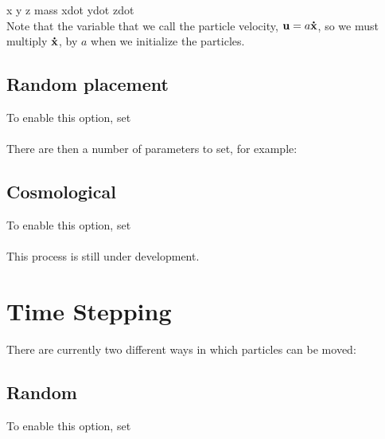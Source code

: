 x y z mass xdot ydot zdot \\

Note that the variable that we call the particle velocity, ${\mathbf u} = a {\bf \dot{x}}$, 
so we must multiply ${\bf \dot{x}}$, by $a$ when we initialize the particles.

\subsection{Random placement}

To enable this option, set \\

 \\

\noindent There are then a number of parameters to set, for example: \\




\subsection{Cosmological}

To enable this option, set \\

 \\

\noindent This process is still under development.

\section{Time Stepping}

\noindent There are currently two different ways in which particles can be moved:

\subsection{Random}

\noindent To enable this option, set \\

 \\

